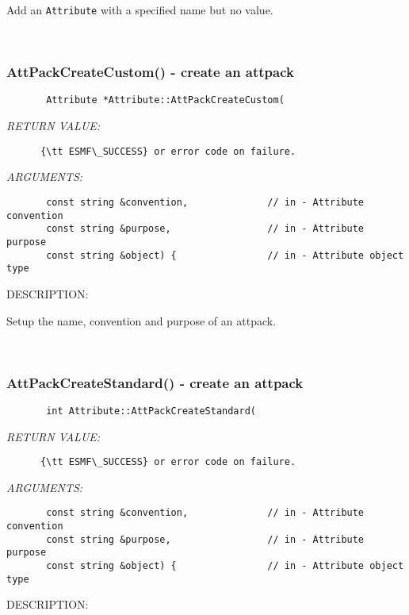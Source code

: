        Add an {\tt Attribute} with a specified name but no value.
   
 
\mbox{}\hrulefill\
 
\subsubsection [AttPackCreateCustom()] {AttPackCreateCustom() - create an attpack}


  
\begin{verbatim}       Attribute *Attribute::AttPackCreateCustom(\end{verbatim}{\em RETURN VALUE:}
\begin{verbatim}      {\tt ESMF\_SUCCESS} or error code on failure.
   \end{verbatim}{\em ARGUMENTS:}
\begin{verbatim}       const string &convention,              // in - Attribute convention
       const string &purpose,                 // in - Attribute purpose
       const string &object) {                // in - Attribute object type\end{verbatim}
{\sf DESCRIPTION:\\ }


       Setup the name, convention and purpose of an attpack.
   
 
\mbox{}\hrulefill\
 
\subsubsection [AttPackCreateStandard()] {AttPackCreateStandard() - create an attpack}


  
\begin{verbatim}       int Attribute::AttPackCreateStandard(\end{verbatim}{\em RETURN VALUE:}
\begin{verbatim}      {\tt ESMF\_SUCCESS} or error code on failure.
   \end{verbatim}{\em ARGUMENTS:}
\begin{verbatim}       const string &convention,              // in - Attribute convention
       const string &purpose,                 // in - Attribute purpose
       const string &object) {                // in - Attribute object type
   \end{verbatim}
{\sf DESCRIPTION:\\ }


